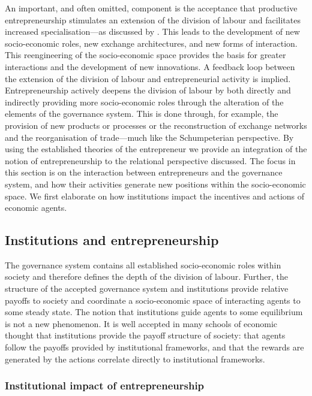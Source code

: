 An important, and often omitted, component is the acceptance that productive entrepreneurship stimulates an extension of the division of labour and facilitates increased specialisation---as discussed by \citet{Smith1776}. This leads to the development of new socio-economic roles, new exchange architectures, and new forms of interaction. This reengineering of the socio-economic space provides the basis for greater interactions and the development of new innovations. A feedback loop between the extension of the division of labour and entrepreneurial activity is implied. Entrepreneurship actively deepens the division of labour by both directly and indirectly providing more socio-economic roles through the alteration of the elements of the governance system. This is done through, for example, the provision of new products or processes or the reconstruction of exchange networks and the reorganisation of trade---much like the Schumpeterian perspective. By using the established theories of the entrepreneur we provide an integration of the notion of entrepreneurship to the relational perspective discussed. The focus in this section is on the interaction between entrepreneurs and the governance system, and how their activities generate new positions within the socio-economic space. We first elaborate on how institutions impact the incentives and actions of economic agents.

\subsection{Institutions and entrepreneurship} \label{entrepreneurshipInstitutions}

The governance system contains all established socio-economic roles within society and therefore defines the depth of the division of labour. Further, the structure of the accepted governance system and institutions provide relative payoffs to society and coordinate a socio-economic space of interacting agents to some steady state. The notion that institutions guide agents to some equilibrium is not a new phenomenon. It is well accepted in many schools of economic thought that institutions provide the payoff structure of society: that agents follow the payoffs provided by institutional frameworks, and that the rewards are generated by the actions correlate directly to institutional frameworks.

\subsubsection{Institutional impact of entrepreneurship}

